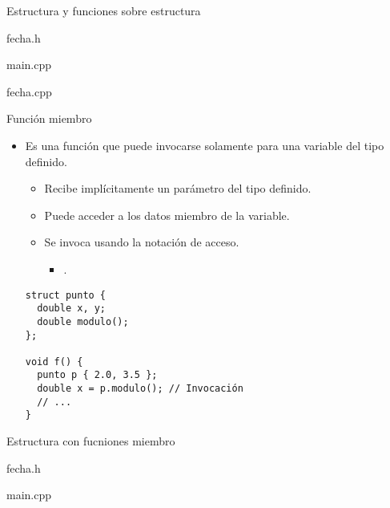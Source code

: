 \begin{frame}{Estructura y funciones sobre estructura}
\vspace{-.8em}
\begin{block}{fecha.h}

\end{block}
\begin{block}{main.cpp}

\end{block}
\end{frame}

\vspace{-.25em}
\begin{frame}
\begin{block}{fecha.cpp}
\mode<presentation>{

}
\end{block}
\end{frame}

\begin{frame}[fragile]{Función miembro}
\begin{itemize}
  \item Es una función que puede invocarse solamente para una variable del tipo definido.
    \begin{itemize}
      \item Recibe implícitamente un parámetro del tipo definido.
      \item Puede acceder a los datos miembro de la variable.
      \item Se invoca usando la notación de acceso.
        \begin{itemize}
          \item {}.
        \end{itemize}
    \end{itemize}
\begin{lstlisting}
struct punto {
  double x, y;
  double modulo();
};

void f() {
  punto p { 2.0, 3.5 };
  double x = p.modulo(); // Invocación
  // ...
}
\end{lstlisting}
\end{itemize}
\end{frame}

\begin{frame}{Estructura con fucniones miembro}
\begin{block}{fecha.h}

\end{block}
\begin{block}{main.cpp}

\end{block}
\end{frame}

